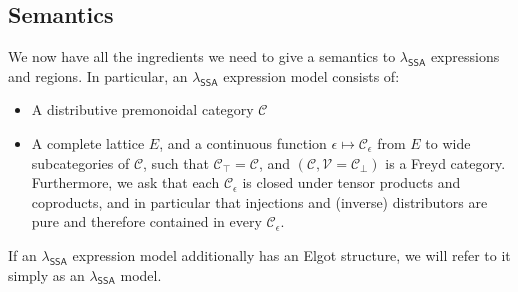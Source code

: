 \documentclass[acmsmall,screen,review]{acmart}
\newcounter{todos}
\newcommand{\todo}[1]{\stepcounter{todos} \textcolor{red}{\textbf{TODO \arabic{todos}}: #1}}
\newcommand{\mc}[1]{\ensuremath{\mathcal{#1}}}
\newcommand{\ms}[1]{\ensuremath{\mathsf{#1}}}
\newcommand{\isotopessa}{\(\lambda_{\ms{SSA}}\)}
\begin{document}

\subsection{Semantics}

We now have all the ingredients we need to give a semantics to \isotopessa{} expressions and regions.
In particular, an \isotopessa{} expression model consists of:
\begin{itemize}
  \item A distributive premonoidal category $\mc{C}$
  \item A complete lattice $E$, and a continuous function $\epsilon \mapsto \mc{C}_\epsilon$ from
  $E$ to wide subcategories of $\mc{C}$, such that $\mc{C}_\top = \mc{C}$, and $(\mc{C}, \mc{V} =
  \mc{C}_\bot)$ is a Freyd category. Furthermore, we ask that each $\mc{C}_\epsilon$ is closed under
  tensor products and coproducts, and in particular that injections and (inverse) distributors are
  pure and therefore contained in every $\mc{C}_\epsilon$.
\end{itemize}
If an \isotopessa{} expression model additionally has an Elgot structure, we will refer to it simply
as an \isotopessa{} model.
\end{document}
